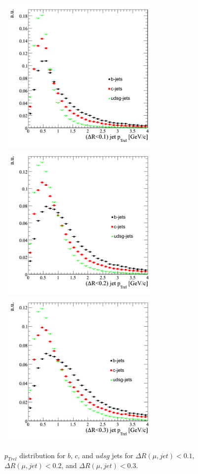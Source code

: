 \begin{figure}[htbp]
  \begin{center}
    \includegraphics[width=80mm]{Figures/jet_ptrel_deltaR1.png}
    \includegraphics[width=80mm]{Figures/jet_ptrel_deltaR2.png}
    \includegraphics[width=80mm]{Figures/jet_ptrel_deltaR3.png}
  \end{center}
  \caption{$p_{Trel}$ distribution for $b$, $c$, and $udsg$ jets for $\Delta R(\mu,jet)<0.1$, $\Delta R(\mu,jet)<0.2$, and $\Delta R(\mu,jet)<0.3$.}
  \label{fig:jet_ptrel}
\end{figure}

